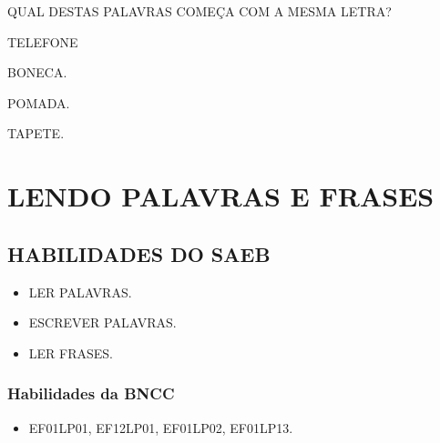 
QUAL DESTAS PALAVRAS COMEÇA COM A MESMA LETRA?

\begin{multicols}{2}
\begin{escolha}
\item TELEFONE

\item BONECA.

\item POMADA.

\item TAPETE.
\end{escolha}
\end{multicols}



\chapter{LENDO PALAVRAS E FRASES}

\vspace*{-1cm}

\section*{HABILIDADES DO SAEB}

\begin{itemize}
\item LER PALAVRAS.

\item ESCREVER PALAVRAS.

\item LER FRASES.
\end{itemize}

\subsection{Habilidades da BNCC}

\begin{itemize}
\item EF01LP01, EF12LP01, EF01LP02, EF01LP13.
\end{itemize}


